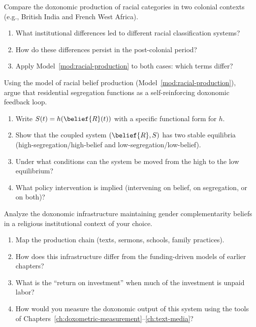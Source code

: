 \begin{exercise}
Compare the doxonomic production of racial categories in two colonial contexts (e.g., British India and French West Africa).
\begin{enumerate}[nosep]
  \item What institutional differences led to different racial classification systems?
  \item How do these differences persist in the post-colonial period?
  \item Apply Model~\ref{mod:racial-production} to both cases: which terms differ?
\end{enumerate}
\end{exercise}

\begin{exercise}
Using the model of racial belief production (Model~\ref{mod:racial-production}), argue that residential segregation functions as a self-reinforcing doxonomic feedback loop.
\begin{enumerate}[nosep]
  \item Write $S(t) = h(\belief{R}(t))$ with a specific functional form for $h$.
  \item Show that the coupled system $(\belief{R}, S)$ has two stable equilibria (high-segregation/high-belief and low-segregation/low-belief).
  \item Under what conditions can the system be moved from the high to the low equilibrium?
  \item What policy intervention is implied (intervening on belief, on segregation, or on both)?
\end{enumerate}
\end{exercise}

\begin{exercise}
Analyze the doxonomic infrastructure maintaining gender complementarity beliefs in a religious institutional context of your choice.
\begin{enumerate}[nosep]
  \item Map the production chain (texts, sermons, schools, family practices).
  \item How does this infrastructure differ from the funding-driven models of earlier chapters?
  \item What is the ``return on investment'' when much of the investment is unpaid labor?
  \item How would you measure the doxonomic output of this system using the tools of Chapters~\ref{ch:doxometric-measurement}--\ref{ch:text-media}?
\end{enumerate}
\end{exercise}

